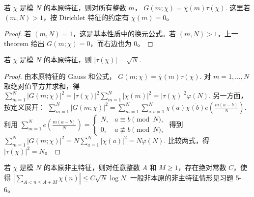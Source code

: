 \documentclass[oneside]{AJbook}
\begin{document}
\begin{theorem}
若 $\chi$ 是模 $N$ 的本原特征，则对所有整数 $m$，
\(
  G(m;\chi)=\overline{\chi}(m)\tau(\chi).
\)
这里若 $(m,N)>1$，按 Dirichlet 特征的约定有 $\overline{\chi}(m)=0$。
\end{theorem}

\begin{proof}
若 $(m,N)=1$，这是基本性质中的换元公式。若 $(m,N)>1$，上一 theorem 给出
$G(m;\chi)=0$，而右边也为 $0$。
\end{proof}

\begin{theorem}
若 $\chi$ 是模 $N$ 的本原特征，则
\(
  |\tau(\chi)|=\sqrt N.
\)
\end{theorem}

\begin{proof}
由本原特征的 Gauss 和公式，
\(
  G(m;\chi)=\overline{\chi}(m)\tau(\chi).
\)
对 $m=1,\ldots,N$ 取绝对值平方并求和，得
\(
  \sum_{m=1}^{N}|G(m;\chi)|^2
  =
  |\tau(\chi)|^2
  \sum_{m=1}^{N}|\chi(m)|^2
  =
  |\tau(\chi)|^2\varphi(N).
\)
另一方面，按定义展开：
\(
  \sum_{m=1}^{N}|G(m;\chi)|^2
  =
  \sum_{m=1}^{N}
  \sum_{a,b=1}^{N}
  \chi(a)\overline{\chi(b)}
  e\!\left(\frac{m(a-b)}{N}\right).
\)
利用
\(
  \sum_{m=1}^{N}e\!\left(\frac{m(a-b)}{N}\right)
  =
  \begin{cases}
    N,& a\equiv b\pmod N,\\
    0,& a\not\equiv b\pmod N,
  \end{cases}
\)
得到
\(
  \sum_{m=1}^{N}|G(m;\chi)|^2
  =
  N\sum_{a=1}^{N}|\chi(a)|^2
  =
  N\varphi(N).
\)
比较两式，得 $|\tau(\chi)|^2=N$。
\end{proof}

\begin{theorem}
若 $\chi$ 是模 $N$ 的本原非主特征，则对任意整数 $A$ 和 $M\ge1$，存在绝对常数 $C$，使得
\(
  \left|\sum_{A<n\le A+M}\chi(n)\right|
  \le C\sqrt N\log N.
\)
一般非本原的非主特征情形见习题 5-6。
\end{theorem}
\end{document}
